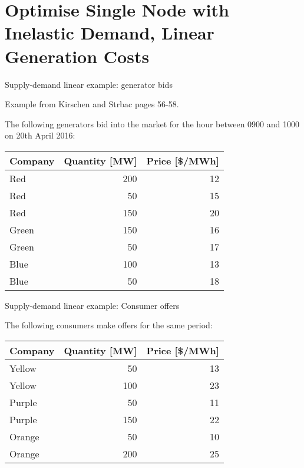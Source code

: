 \documentclass[10pt,aspectratio=169,dvipsnames]{beamer}
\newcommand{\ra}[1]{\renewcommand{\arraystretch}{#1}}
\begin{document}
\section{Optimise Single Node with Inelastic Demand, Linear Generation Costs}




\begin{frame}{Supply-demand linear example: generator bids}

  Example from Kirschen and Strbac pages 56-58.

  The following generators bid into the market for the hour between 0900 and 1000 on 20th April 2016:
  \ra{1.1}
  \begin{table}[!t]
    \begin{tabular}{lrr}
      \toprule
      Company & Quantity [MW] &  Price [\$/MWh]\\
      \midrule
      Red & 200 & 12 \\
      Red & 50 & 15 \\
      Red & 150 & 20 \\
      Green & 150 & 16 \\
      Green & 50 & 17 \\
      Blue & 100 & 13 \\
      Blue & 50 & 18 \\
      \bottomrule
    \end{tabular}
  \end{table}


\end{frame}



\begin{frame}{Supply-demand linear example: Consumer offers}

  The following consumers make offers for the same period:
  \ra{1.1}
  \begin{table}[!t]
    \begin{tabular}{lrr}
      \toprule
      Company & Quantity [MW] &  Price [\$/MWh]\\
      \midrule
      Yellow & 50 & 13 \\
      Yellow & 100 & 23 \\
      Purple & 50 & 11 \\
      Purple & 150 & 22 \\
      Orange & 50 & 10 \\
      Orange & 200 & 25 \\
      \bottomrule
    \end{tabular}
  \end{table}


\end{frame}
\end{document}
